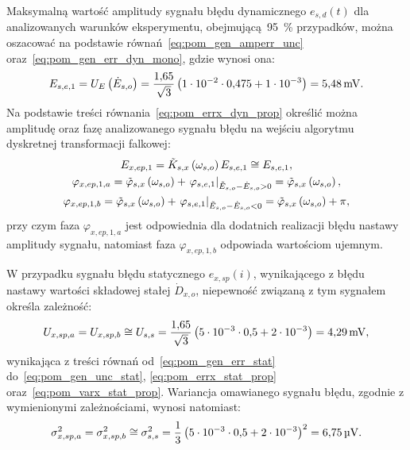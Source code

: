 Maksymalną wartość amplitudy sygnału błędu dynamicznego $e_{s,d}(t)$ dla analizowanych warunków eksperymentu, obejmującą~\qty{95}{\percent} przypadków, można oszacować na podstawie równań~\eqref{eq:pom_gen_amperr_unc} oraz~\eqref{eq:pom_gen_err_dyn_mono}, gdzie wynosi ona:
\begin{equation}
E_{s,e,1} = U_{E} \left(\dot{E}_{s,o}\right) = \frac{\num{1.65}}{\sqrt{3}} \left(\num{1e-2} \cdot \num{0.475} + \num{1e-3}\right) = \qty{5.48}{mV} \label{eq:pom_mono_dyn_amp_in}.
\end{equation}
Na podstawie treści równania~\eqref{eq:pom_errx_dyn_prop} określić można amplitudę oraz fazę analizowanego sygnału błędu na wejściu algorytmu dyskretnej transformacji falkowej:
\begin{gather}
E_{x,ep,1} = \tilde{K}_{s,x} \left(\omega_{s,o}\right) E_{s,e,1} \cong E_{s,e,1} \label{eq:pom_mono_dyn_prop_amp_mid}, \\
\varphi_{x,ep,1,a} = \tilde{\varphi}_{s,x} \left(\omega_{s,o}\right) + \left. \varphi_{s,e,1} \right|_{\tilde{E}_{s,o} - \dot{E}_{s,o} > 0} = \tilde{\varphi}_{s,x} \left(\omega_{s,o}\right) \label{eq:pom_mono_dyn_prop_phi_mid_a}, \\
\varphi_{x,ep,1,b} = \tilde{\varphi}_{s,x} \left(\omega_{s,o}\right) + \left. \varphi_{s,e,1} \right|_{\tilde{E}_{s,o} - \dot{E}_{s,o} < 0} = \tilde{\varphi}_{s,x} \left(\omega_{s,o}\right) + \pi \label{eq:pom_mono_dyn_prop_phi_mid_b},
\end{gather}
przy czym faza $\varphi_{x,ep,1,a}$ jest odpowiednia dla dodatnich realizacji błędu nastawy amplitudy sygnału, natomiast faza $\varphi_{x,ep,1,b}$ odpowiada wartościom ujemnym.

W przypadku sygnału błędu statycznego $e_{x,sp}(i)$, wynikającego z błędu nastawy wartości składowej stałej $\dot{D}_{x,o}$, niepewność związaną z tym sygnałem określa zależność:
\begin{equation}
U_{x,sp,a} = U_{x,sp,b} \cong U_{s,s} = \frac{\num{1.65}}{\sqrt{3}} \left(\num{5e-3} \cdot \num{0.5} + \num{2e-3}\right) = \qty{4.29}{mV} \label{eq:pom_mono_stat_unc_mid},
\end{equation}
wynikająca z treści równań od~\eqref{eq:pom_gen_err_stat} do~\eqref{eq:pom_gen_unc_stat}, \eqref{eq:pom_errx_stat_prop} oraz~\eqref{eq:pom_varx_stat_prop}. Wariancja omawianego sygnału błędu, zgodnie z wymienionymi zależnościami, wynosi natomiast:
\begin{equation}
\sigma_{x,sp,a}^{2} = \sigma_{x,sp,b}^{2} \cong \sigma_{s,s}^{2} = \frac{1}{3} \left(\num{5e-3} \cdot \num{0.5} + \num{2e-3}\right)^{2} = \qty{6.75}{\micro V} \label{eq:pom_mono_stat_var_mid}.
\end{equation}

